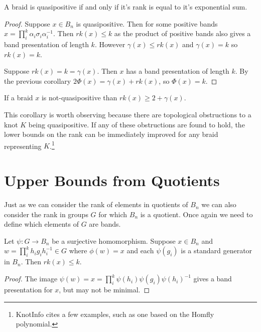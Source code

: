 \documentclass[12pt]{thesis}
\begin{document}
\begin{proposition}
    \label{quasipositive-from-rank}
    A braid is quasipositive if and only if it's rank is equal to it's exponential sum.
\end{proposition}

\begin{proof}

    Suppose $x \in B_{n}$ is quasipositive.
    Then for some positive bands $x = \prod_{i}^{k} \alpha_{i} \sigma_{i} \alpha_{i}^{-1}$.
    Then $rk(x) \leq k$ as the product of positive bands also gives a band presentation of length $k$.
    However $\gamma(x) \leq rk(x)$ and $\gamma(x) = k$ so 
    $rk(x) = k$.

    Suppose $rk(x) = k = \gamma(x)$. Then $x$ has a band presentation of length $k$.
    By the previous corollary $2\Phi(x) = \gamma(x) + rk(x)$,
    so $\Phi(x) = k$.
\end{proof}

\begin{corollary}
    If a braid $x$ is not-quasipositive than $rk(x) \geq 2 + \gamma(x)$.
\end{corollary}

This corollary is worth observing because there are topological obstructions
to a knot $K$ being quasipositive.
If any of these obstructions are found to hold, the lower bounds
on the rank can be immediately improved for any braid
representing $K$.\footnote{ KnotInfo\cite{knotinfo} cites a few examples,
such as one based on the Homfly polynomial. }

\section{Upper Bounds from Quotients}

Just as we can consider the rank of elements in quotients of $B_{n}$
we can also consider the rank in groups $G$ for which $B_{n}$ is a quotient.
Once again we need to define which elements of $G$
are bands.
\begin{proposition}
    \label{prop:upper-bounds-from-quotient}
    Let $\psi \colon G \rightarrow B_{n}$ be a surjective homomorphism.
    Suppose $x \in B_{n}$ and $w = \prod_{i}^{k} h_{i}g_{i}h_{i}^{-1} \in G$
    where $\phi(w) = x$
    and each $\psi(g_{i})$ is a standard
    generator in $B_{n}$. 
    Then $rk(x) \leq k$.
\end{proposition}
\begin{proof}
    The image $\psi(w) = x = \prod_{i}^{k} \psi(h_{i}) \psi(g_{i}) \psi(h_{i})^{-1}$
    gives a band presentation for $x$, but may not be minimal.
\end{proof}
\end{document}

